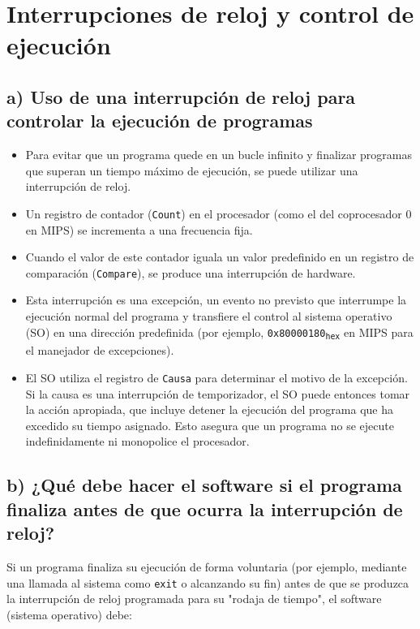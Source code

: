 \documentclass{article}
\begin{document}
\section{Interrupciones de reloj y control de ejecución}

\subsection*{a) Uso de una interrupción de reloj para controlar la ejecución de programas}

\begin{itemize}
    \item Para evitar que un programa quede en un bucle infinito y finalizar programas que superan un tiempo máximo de ejecución, se puede utilizar una interrupción de reloj.
    
    \item Un registro de contador (\texttt{Count}) en el procesador (como el del coprocesador 0 en MIPS) se incrementa a una frecuencia fija.
    
    \item Cuando el valor de este contador iguala un valor predefinido en un registro de comparación (\texttt{Compare}), se produce una interrupción de hardware.
    
    \item Esta interrupción es una excepción, un evento no previsto que interrumpe la ejecución normal del programa y transfiere el control al sistema operativo (SO) en una dirección predefinida (por ejemplo, \texttt{0x80000180\textsubscript{hex}} en MIPS para el manejador de excepciones).
    
    \item El SO utiliza el registro de \texttt{Causa} para determinar el motivo de la excepción. Si la causa es una interrupción de temporizador, el SO puede entonces tomar la acción apropiada, que incluye detener la ejecución del programa que ha excedido su tiempo asignado. Esto asegura que un programa no se ejecute indefinidamente ni monopolice el procesador.
\end{itemize}

\subsection*{b) ¿Qué debe hacer el software si el programa finaliza antes de que ocurra la interrupción de reloj?}

Si un programa finaliza su ejecución de forma voluntaria (por ejemplo, mediante una llamada al sistema como \texttt{exit} o alcanzando su fin) antes de que se produzca la interrupción de reloj programada para su "rodaja de tiempo", el software (sistema operativo) debe:
\end{document}
